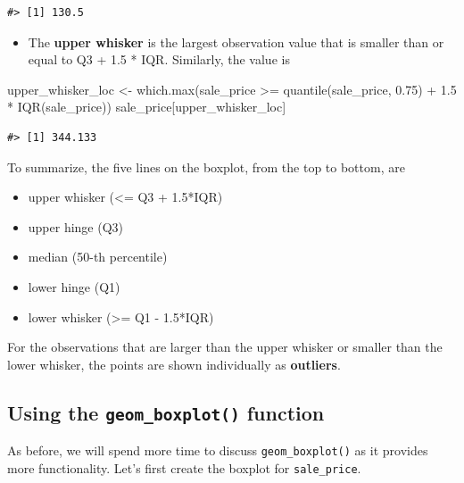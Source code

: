 \documentclass[
]{book}
\newenvironment{Shaded}{\begin{snugshade}}{\end{snugshade}}
\newcommand{\FloatTok}[1]{\textcolor[rgb]{0.00,0.00,0.81}{#1}}
\newcommand{\FunctionTok}[1]{\textcolor[rgb]{0.00,0.00,0.00}{#1}}
\newcommand{\NormalTok}[1]{#1}
\newcommand{\OtherTok}[1]{\textcolor[rgb]{0.56,0.35,0.01}{#1}}
\newcommand{\SpecialCharTok}[1]{\textcolor[rgb]{0.00,0.00,0.00}{#1}}
\providecommand{\tightlist}{%
  \setlength{\itemsep}{0pt}\setlength{\parskip}{0pt}}
\begin{document}
\begin{verbatim}
#> [1] 130.5
\end{verbatim}

\begin{itemize}
\tightlist
\item
  The \textbf{upper whisker} is the largest observation value that is smaller than or equal to Q3 + 1.5 * IQR. Similarly, the value is
\end{itemize}

\begin{Shaded}
\begin{Highlighting}[]
\NormalTok{upper\_whisker\_loc }\OtherTok{\textless{}{-}} \FunctionTok{which.max}\NormalTok{(sale\_price }\SpecialCharTok{\textgreater{}=} \FunctionTok{quantile}\NormalTok{(sale\_price, }\FloatTok{0.75}\NormalTok{) }\SpecialCharTok{+} \FloatTok{1.5} \SpecialCharTok{*} \FunctionTok{IQR}\NormalTok{(sale\_price))}
\NormalTok{sale\_price[upper\_whisker\_loc]}
\end{Highlighting}
\end{Shaded}

\begin{verbatim}
#> [1] 344.133
\end{verbatim}

To summarize, the five lines on the boxplot, from the top to bottom, are

\begin{itemize}
\tightlist
\item
  upper whisker (\textless= Q3 + 1.5*IQR)
\item
  upper hinge (Q3)
\item
  median (50-th percentile)
\item
  lower hinge (Q1)
\item
  lower whisker (\textgreater= Q1 - 1.5*IQR)
\end{itemize}

For the observations that are larger than the upper whisker or smaller than the lower whisker, the points are shown individually as \textbf{outliers}.

\hypertarget{using-the-geom_boxplot-function}{%
\subsection{\texorpdfstring{Using the \texttt{geom\_boxplot()} function}{Using the geom\_boxplot() function}}\label{using-the-geom_boxplot-function}}

As before, we will spend more time to discuss \texttt{geom\_boxplot()} as it provides more functionality. Let's first create the boxplot for \texttt{sale\_price}.
\end{document}
